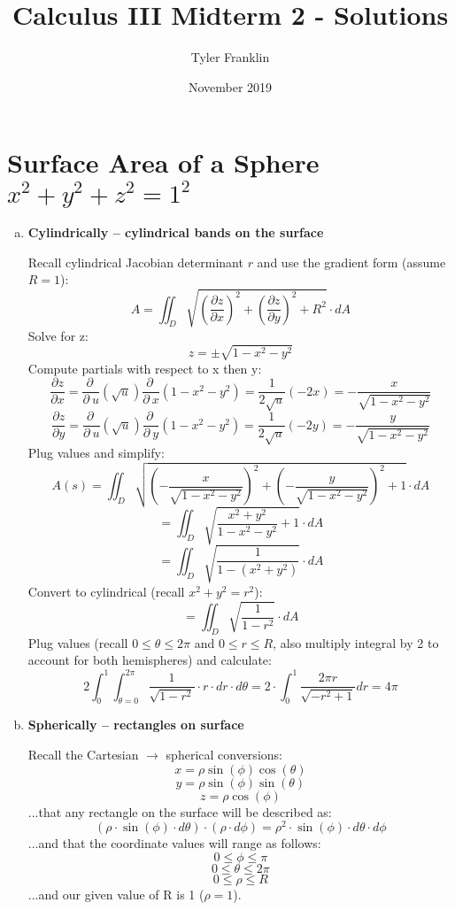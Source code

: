 \documentclass{article}
\title{Calculus III Midterm 2 - Solutions}
\author{Tyler Franklin}
\date{November 2019}
\begin{document}
\maketitle

\section{Surface Area of a Sphere $x^2 + y^2 + z^2 = 1^2$ }
\begin{enumerate}[a.]
	\item \textbf{Cylindrically -- cylindrical bands on the surface }

            Recall cylindrical Jacobian determinant $ r $ and use the gradient form (assume $R = 1$):
            \[ A = \iint_{D}\sqrt{ (\frac{\partial z}{\partial x})^2 + (\frac{\partial z}{\partial y})^2 + R^2 } \cdot dA \]
            Solve for z:
            \[ z = \pm\sqrt{1-x^{2}-y^{2}} \]
            Compute partials with respect to x then y:
            \[ \frac{\partial z}{\partial x} = \frac{\partial \:}{\partial \:u}\left(\sqrt{u}\right)\frac{\partial \:}{\partial \:x}\left(1-x^2-y^2\right) = \frac{1}{2\sqrt{u}}\left(-2x\right) = -\frac{x}{\sqrt{1-x^2-y^2}} \]
            \[ \frac{\partial z}{\partial y} = \frac{\partial \:}{\partial \:u}\left(\sqrt{u}\right)\frac{\partial \:}{\partial \:y}\left(1-x^2-y^2\right) = \frac{1}{2\sqrt{u}}\left(-2y\right) = -\frac{y}{\sqrt{1-x^2-y^2}} \]
            Plug values and simplify:
            \[ A(s) = \iint_{D}\sqrt{\left(-\frac{x}{\sqrt{1-x^2-y^2}}\right)^2+\left(-\frac{y}{\sqrt{1-x^2-y^2}}\right)^2+1}  \cdot dA \]
            \[ = \iint_{D}\sqrt{\frac{x^2+y^2}{1-x^2-y^2}+1}  \cdot dA \]
            \[ = \iint_{D}\sqrt{\frac{1}{1-(x^2+y^2)}}  \cdot dA \]
            Convert to cylindrical (recall $x^2 + y^2 = r^2$):
            \[ = \iint_{D}\sqrt{\frac{1}{1-r^2}}  \cdot dA \]
            Plug values (recall $0 \leq \theta \leq 2\pi $ and $0 \leq r \leq R $, also multiply integral by 2 to account for both hemispheres) and calculate:
            \[ 2\int_{0}^{1}\int_{\theta=0}^{2\pi} \frac{1}{\sqrt{1-r^2}}\cdot r \cdot dr \cdot d\theta = 2\cdot \int _0^1\frac{2\pi r}{\sqrt{-r^2+1}}dr = 4\pi \]

	\item \textbf{Spherically -- rectangles on surface}

            Recall the Cartesian $\rightarrow$ spherical conversions:
            \[ x = \rho\sin(\phi)\cos(\theta)   \]
            \[ y = \rho\sin(\phi)\sin(\theta)  \]
            \[ z = \rho\cos(\phi)  \]
            ...that any rectangle on the surface will be described as:
            \[ (\rho\cdot\sin(\phi)\cdot d \theta)\cdot(\rho\cdot d \phi) = \rho^2\cdot\sin(\phi)\cdot d\theta\cdot d\phi \]
            ...and that the coordinate values will range as follows:
            \[ 0 \leq \phi \leq \pi  \]
            \[ 0 \leq \theta \leq 2\pi  \]
            \[ 0 \leq \rho \leq R \]
            ...and our given value of R is 1 ($\rho = 1$).


\end{enumerate}
\end{document}
